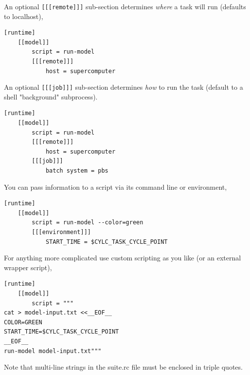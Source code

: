 
An optional \lstinline=[[[remote]]]= sub-section determines {\em where} a task
will run (defaults to localhost), 

\begin{lstlisting}[language=suiterc]
[runtime]
    [[model]]
        script = run-model
        [[[remote]]]
            host = supercomputer
\end{lstlisting}


An optional \lstinline=[[[job]]]= sub-section determines {\em how} to run the
task (default to a shell "background" subprocess).
\begin{lstlisting}[language=suiterc]
[runtime]
    [[model]]
        script = run-model
        [[[remote]]]
            host = supercomputer
        [[[job]]]
            batch system = pbs
\end{lstlisting}


You can pass information to a script via its command line or environment,

\begin{lstlisting}[language=suiterc]
[runtime]
    [[model]]
        script = run-model --color=green
        [[[environment]]]
            START_TIME = $CYLC_TASK_CYCLE_POINT
\end{lstlisting}

For anything more complicated use custom scripting as you like (or an external
wrapper script),
\begin{lstlisting}[language=suiterc]
[runtime]
    [[model]]
        script = """
cat > model-input.txt <<__EOF__
COLOR=GREEN
START_TIME=$CYLC_TASK_CYCLE_POINT
__EOF__
run-model model-input.txt"""
\end{lstlisting}

Note that multi-line strings in the suite.rc file must be enclosed in triple
quotes.

